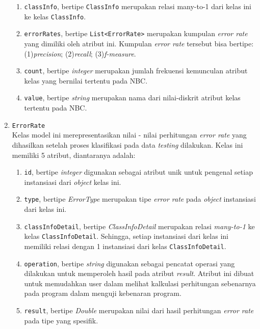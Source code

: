 \begin{enumerate}
\begin{enumerate}
		\item \texttt{classInfo}, bertipe \texttt{ClassInfo} merupakan relasi many-to-1 dari kelas ini ke kelas \texttt{ClassInfo}.
		
		\item \texttt{errorRates}, bertipe \texttt{List<ErrorRate>} merupakan kumpulan \textit{error rate} yang dimiliki oleh atribut ini. Kumpulan \textit{error rate} tersebut bisa bertipe: (1)\textit{precision}; (2)\textit{recall}; (3)\textit{f-measure}.
				
		\item \texttt{count}, bertipe \textit{integer} merupakan jumlah frekuensi kemunculan atribut kelas yang bernilai tertentu pada NBC.

		\item \texttt{value}, bertipe \textit{string} merupakan nama dari nilai-diskrit atribut kelas tertentu pada NBC.
		
	\end{enumerate}

	\item \texttt{ErrorRate}\\
	Kelas model ini merepresentasikan nilai - nilai perhitungan \textit{error rate} yang dihasilkan setelah proses klasifikasi pada data \textit{testing} dilakukan. Kelas ini memiliki 5 atribut, diantaranya adalah:
	\begin{enumerate}
		\item \texttt{id}, bertipe \textit{integer} digunakan sebagai atribut unik untuk pengenal setiap instansiasi dari \textit{object} kelas ini.
		
		\item \texttt{type}, bertipe \textit{ErrorType} merupakan tipe \textit{error rate} pada \textit{object} instansiasi dari kelas ini. 
		
		\item \texttt{classInfoDetail}, bertipe \textit{ClassInfoDetail} merupakan relasi \textit{many-to-1} ke kelas \texttt{ClassInfoDetail}. Sehingga, setiap instansiasi dari kelas ini memiliki relasi dengan 1 instansiasi dari kelas \texttt{ClassInfoDetail}.
		
		\item \texttt{operation}, bertipe \textit{string} digunakan sebagai pencatat operasi yang dilakukan untuk memperoleh hasil pada atribut \textit{result}. Atribut ini dibuat untuk memudahkan user dalam melihat kalkulasi perhitungan sebenarnya pada program dalam menguji kebenaran program.
		
		\item \texttt{result}, bertipe \textit{Double} merupakan nilai dari hasil perhitungan \textit{error rate} pada tipe yang spesifik.
		

\end{enumerate}
\end{enumerate}
